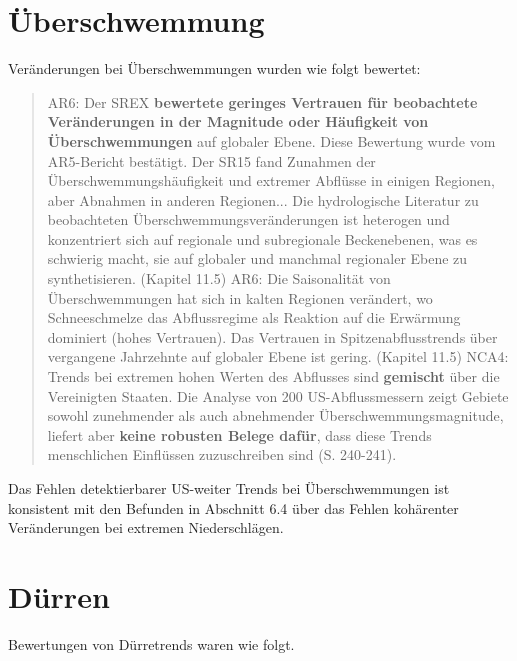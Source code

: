 \documentclass[12pt,paper=a4,DIV=12,parskip=never,chapterprefix=false,headings=standardclasses]{scrreprt}
\begin{document}
\section{Überschwemmung}
Veränderungen bei Überschwemmungen wurden wie folgt bewertet:
\begin{quote}
AR6: Der SREX \textbf{bewertete geringes Vertrauen für beobachtete Veränderungen in der Magnitude oder Häufigkeit von Überschwemmungen} auf globaler Ebene. Diese Bewertung wurde vom AR5-Bericht bestätigt. Der SR15 fand Zunahmen der Überschwemmungshäufigkeit und extremer Abflüsse in einigen Regionen, aber Abnahmen in anderen Regionen... Die hydrologische Literatur zu beobachteten Überschwemmungsveränderungen ist heterogen und konzentriert sich auf regionale und subregionale Beckenebenen, was es schwierig macht, sie auf globaler und manchmal regionaler Ebene zu synthetisieren. (Kapitel 11.5)
AR6: Die Saisonalität von Überschwemmungen hat sich in kalten Regionen verändert, wo Schneeschmelze das Abflussregime als Reaktion auf die Erwärmung dominiert (hohes Vertrauen). Das Vertrauen in Spitzenabflusstrends über vergangene Jahrzehnte auf globaler Ebene ist gering. (Kapitel 11.5)
NCA4: Trends bei extremen hohen Werten des Abflusses sind \textbf{gemischt} über die Vereinigten Staaten. Die Analyse von 200 US-Abflussmessern zeigt Gebiete sowohl zunehmender als auch abnehmender Überschwemmungsmagnitude, liefert aber \textbf{keine robusten Belege dafür}, dass diese Trends menschlichen Einflüssen zuzuschreiben sind (S. 240-241).
\end{quote}

Das Fehlen detektierbarer US-weiter Trends bei Überschwemmungen ist konsistent mit den Befunden in Abschnitt 6.4 über das Fehlen kohärenter Veränderungen bei extremen Niederschlägen.

\section{Dürren}
Bewertungen von Dürretrends waren wie folgt.
\end{document}
